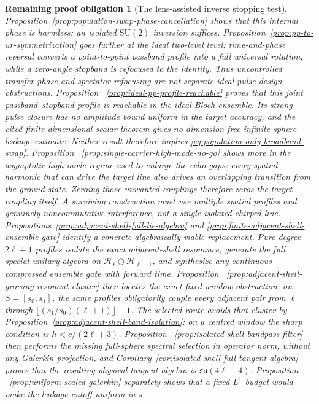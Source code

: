 \documentclass[11pt]{article}
\newtheorem{problem}[theorem]{Remaining proof obligation}
\theoremstyle{remark}
\begin{document}
\begin{problem}[The lens-assisted inverse stopping test]
Proposition~\ref{prop:population-swap-phase-cancellation} shows that this
internal phase is harmless: an isolated $\mathrm{SU}(2)$ inversion suffices.
Proposition~\ref{prop:pp-to-ur-symmetrization} goes further at the ideal
two-level level: time-and-phase reversal converts a point-to-point passband
profile into a full universal rotation, while a zero-angle stopband is
refocused to the identity.  Thus uncontrolled transfer phase and spectator
refocusing are not separate ideal pulse-design obstructions.  Proposition
~\ref{prop:ideal-pp-profile-reachable} proves that this joint
passband--stopband profile is reachable in the ideal Bloch ensemble.  Its
strong-pulse closure has no amplitude bound uniform in the target accuracy,
and the cited finite-dimensional scalar theorem gives no dimension-free
infinite-sphere leakage estimate.  Neither result therefore implies
\eqref{eq:population-only-broadband-swap}.  Proposition
~\ref{prop:single-carrier-high-mode-no-go} shows more in the asymptotic
high-mode regime used to enlarge the echo gaps: every spatial harmonic that
can drive the target line also drives an overlapping transition from the
ground state.  Zeroing those unwanted couplings therefore zeros the target
coupling itself.  A surviving construction must use multiple spatial
profiles and genuinely noncommutative interference, not a single isolated
chirped line.  Propositions~\ref{prop:adjacent-shell-full-lie-algebra} and
\ref{prop:finite-adjacent-shell-ensemble-gate} identify a concrete
algebraically viable replacement.  Pure degree-$2\ell+1$ profiles isolate
the exact adjacent-shell resonance, generate the full special-unitary
algebra on $\mathcal H_\ell\oplus\mathcal H_{\ell+1}$, and synthesize any
continuous compressed ensemble gate with forward time.  Proposition
 ~\ref{prop:adjacent-shell-growing-resonant-cluster} then locates the exact
 fixed-window obstruction: on $S=[s_0,s_1]$, the same profiles obligatorily
 couple every adjacent pair from $\ell$ through
 $\lfloor(s_1/s_0)(\ell+1)\rfloor-1$.  The selected route avoids that cluster
 by Proposition~\ref{prop:adjacent-shell-band-isolation}: on a centred window
 the sharp condition is $h<c/(2\ell+3)$.  Proposition
 ~\ref{prop:isolated-shell-bandpass-filter} then performs the missing
 full-sphere spectral selection in operator norm, without any Galerkin
 projection, and Corollary~\ref{cor:isolated-shell-full-tangent-algebra}
 proves that the resulting physical tangent algebra is
 $\mathfrak{su}(4\ell+4)$.  Proposition
 ~\ref{prop:uniform-scaled-galerkin} separately shows that a fixed $L^1$
 budget would make the leakage cutoff uniform in $s$.


\end{problem}
\end{document}
